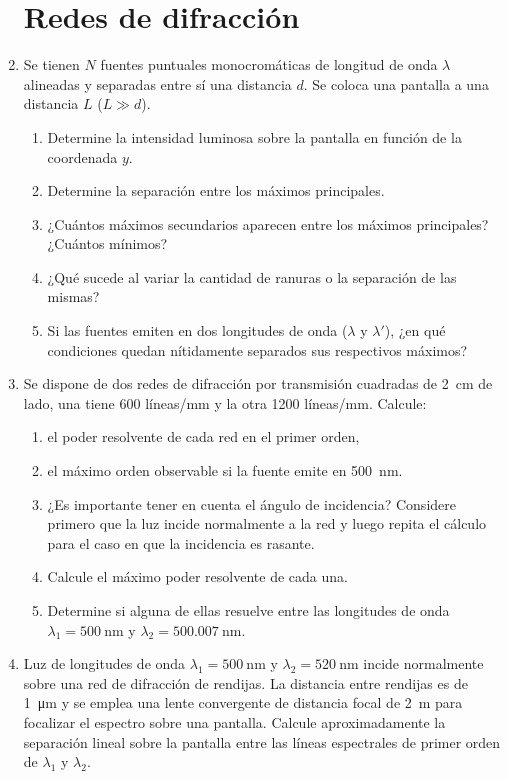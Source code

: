 \documentclass[11pt,spanish,a4paper]{article}
\begin{document}
\begin{enumerate}
\section*{Redes de difracción}

\item 
Se tienen \(N\) fuentes puntuales monocromáticas de longitud de onda \(\lambda\) alineadas y separadas entre sí una distancia \(d\).
Se coloca una pantalla a una distancia \(L\) (\(L \gg d\)).
\begin{enumerate}
	\item Determine la intensidad luminosa sobre la pantalla en función de la coordenada \(y\).
	\item Determine la separación entre los máximos principales.
	\item ¿Cuántos máximos secundarios aparecen entre los máximos principales? ¿Cuántos mínimos?
	\item ¿Qué sucede al variar la cantidad de ranuras o la separación de las mismas?
	\item Si las fuentes emiten en dos longitudes de onda (\(\lambda\) y \(\lambda'\)), ¿en qué condiciones quedan nítidamente separados sus respectivos máximos?
\end{enumerate}


\item
Se dispone de dos redes de difracción por transmisión cuadradas de \SI{2}{\centi\metre} de lado, una tiene \num{600} líneas/\si{\milli\metre} y la otra 1200 líneas/\si{\milli\metre}.
Calcule:
\begin{enumerate}
	\item el poder resolvente de cada red en el primer orden,
	\item el máximo orden observable si la fuente emite en \SI{500}{\nano\metre}.
	\item ¿Es importante tener en cuenta el ángulo de incidencia?
	Considere primero que la luz incide normalmente a la red y luego repita el cálculo para el caso en que la incidencia es rasante.
	\item Calcule el máximo poder resolvente de cada una.
	\item Determine si alguna de ellas resuelve entre las longitudes de onda \(\lambda_1= \SI{500}{\nano\metre}\) y \(\lambda_2= \SI{500,007}{\nano\metre}\).
\end{enumerate}


\item
Luz de longitudes de onda \(\lambda_1= \SI{500}{\nano\metre}\) y \(\lambda_2= \SI{520}{\nano\metre}\) incide normalmente sobre una red de difracción de rendijas.
La distancia entre rendijas es de \SI{1}{\micro\metre} y se emplea una lente convergente de distancia focal de \SI{2}{\metre} para focalizar el espectro sobre una pantalla.
Calcule aproximadamente la separación lineal sobre la pantalla entre las líneas espectrales de primer orden de \(\lambda_1\) y \(\lambda_2\).




\end{enumerate}
\end{document}
